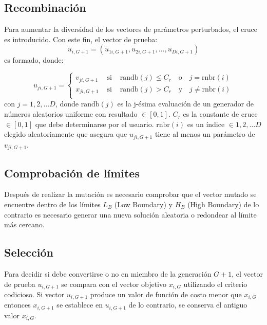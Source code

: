 \documentclass[10pt,a4paper]{article}
\begin{document}
\subsection{Recombinación}

Para aumentar la diversidad de los vectores de parámetros perturbados, el cruce es introducido. Con este fin, el vector de prueba:
\begin{equation}
u_{i,G+1} = (u_{1i,G+1}, u_{2i,G+1}, \ldots , u_{Di,G+1})
\end{equation}
es formado, donde:

\begin{equation} 
	u_{ji,G+1} = \left\{ \begin{array}{lcl}
	v_{ji,G+1} & \text{ si } & \text{randb}(j) \leq C_{r} \quad \text{o} \quad j = \text{rnbr}(i) \\
	x_{ji,G+1}& \text{ si } &\text{randb}(j) > C_{r} \quad \text{y} \quad j \neq \text{rnbr}(i) \\
	\end{array}
	\right.
	\label{ec:recom}
\end{equation}
con $j = 1,2, \ldots D$, donde $\text{randb}(j)$ es la j-ésima evaluación de un generador de números aleatorios uniforme con resultado $\in [0,1]$. $C_{r}$ es la constante de cruce $\in [0, 1]$ que debe determinarse por el usuario. $\text{rnbr}(i)$ es un índice $\in 1,2, \ldots D$ elegido aleatoriamente que asegura que
$u_{ji,G+1}$ tiene al menos un parámetro de $v_{ji,G+1}$.

\subsection{Comprobación de límites}

Después de realizar la mutación es necesario comprobar que el vector mutado se encuentre dentro de los límites $L_{B}$ (Low Boundary) y $H_{B}$ (High Boundary) de lo contrario es necesario generar una nueva solución aleatoria o redondear al límite más cercano.

\subsection{Selección}

Para decidir si debe convertirse o no en miembro de la generación $G + 1$, el vector de prueba $u_{i,G+1}$ se compara con el vector objetivo $x_{i,G}$ utilizando el criterio codicioso. Si vector $u_{i,G+1}$ produce un valor de función de costo menor que  $x_{i,G}$ entonces  $x_{i,G+1}$ se establece en
$u_{i,G+1}$  de lo contrario, se conserva el antiguo valor $x_{i,G}$.
\end{document}
